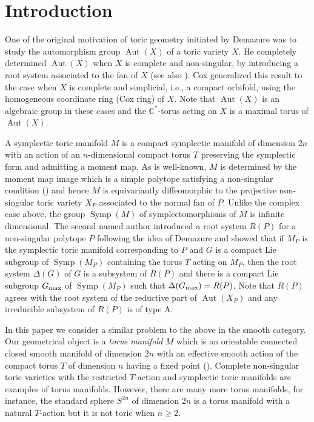 \documentclass[12pt]{amsart}
\theoremstyle{plain} \numberwithin{equation}{section}
\theoremstyle{definition}
\def\C{\mathbb C}
\DeclareMathOperator{\Aut}{Aut}
\DeclareMathOperator{\Symp}{Symp}
\begin{document}
\section{Introduction}
\label{intro}

One of the original motivation of toric geometry initiated by Demazure \cite{de70} was to study the automorphism group $\Aut(X)$ of a toric variety $X$. He completely determined $\Aut(X)$ when $X$ is complete and non-singular, by introducing a root system associated to the fan of $X$ (see also \cite{oda88}). Cox \cite{cox95} generalized this result to the case when $X$ is complete and simplicial, i.e., a compact orbifold, using the homogeneous coordinate ring (Cox ring) of $X$.  Note that $\Aut(X)$ is an algebraic group in these cases and the $\C^*$-torus acting on $X$ is a maximal torus of $\Aut(X)$.   

A symplectic toric manifold $M$ is a compact symplectic manifold of dimension $2n$ with an action of an $n$-dimensional compact torus $T$ preserving the symplectic form and admitting a moment map.  As is well-known, $M$ is determined by the moment map image which is a simple polytope satisfying a non-singular condition (\cite{delz88}) and hence $M$ is equivariantly diffeomorphic to the projective non-singular toric variety $X_P$ associated to the normal fan of $P$. Unlike the complex case above, the group $\Symp(M)$ of symplectomorphisms of $M$ is infinite dimensional.  The second named author \cite{masu10} introduced a root system $R(P)$ for a non-singular polytope $P$ following the idea of Demazure and showed that if $M_P$ is the symplectic toric manifold corresponding to $P$ and $G$ is a compact Lie subgroup of $\Symp(M_P)$ containing the torus $T$ acting on $M_P$, then the root system $\Delta(G)$ of $G$ is a subsystem of $R(P)$ and there is a compact Lie subgroup $G_{\rm max}$ of $\Symp(M_P)$ such that $\Delta(G_{\rm max})=R(P)$.  Note that $R(P)$ agrees with the root system of the reductive part of $\Aut(X_P)$ and any irreducible subsystem of $R(P)$ is of type A. 

In this paper we consider a similar problem to the above in the smooth category.  Our geometrical object is a {\it torus manifold} $M$ which is an orientable connected closed smooth manifold of dimension $2n$ with an effective smooth action of the compact torus $T$ of dimension $n$ having a fixed point (\cite{ha-ma03}).  Complete non-singular toric varieties with the restricted $T$-action and symplectic toric manifolds are examples of torus manifolds.  However, there are many more torus manifolds, for instance, the standard sphere $S^{2n}$ of dimension $2n$ is a torus manifold with a natural $T$-action but it is not toric when $n\ge 2$.  
\end{document}
